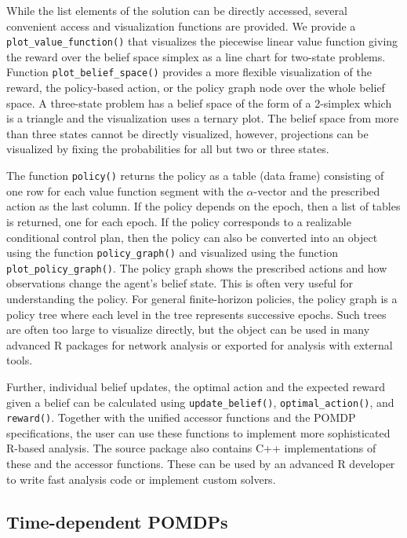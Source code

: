 While the list elements of the solution can be directly accessed, several convenient access and visualization functions are provided.
We provide a \texttt{plot\_value\_function()} that visualizes the piecewise linear value function giving the reward over the belief space simplex as a line chart for two-state problems. Function \texttt{plot\_belief\_space()}
provides a more flexible visualization of the reward, the policy-based action, or the policy graph node
over the whole belief space. A three-state problem has a belief space of the form of a 2-simplex which is a triangle
and the visualization uses a ternary plot.
The belief space from more than three states cannot be directly visualized, however, projections
can be visualized by fixing the probabilities for all but two or three states.

The function \texttt{policy()} returns the policy as a table (data frame) consisting of
one row for each value function segment with the \(\alpha\)-vector and the prescribed action as the last column.
If the policy depends on the epoch, then a list of tables is returned, one for
each epoch.
If the policy corresponds to a realizable conditional control plan, then
the policy can also be converted into an  object using the function
\texttt{policy\_graph()} and visualized using the function \texttt{plot\_policy\_graph()}.
The policy graph shows the prescribed actions and how observations change the agent's belief state.
This is often very useful for understanding the
policy. For general finite-horizon policies, the policy graph is a
policy tree where each level in the tree represents successive epochs.
Such trees are often too large to visualize directly, but the  object
can be used in many advanced R packages for network analysis or exported for analysis with external tools.

Further,
individual belief updates, the optimal action and the expected reward given a belief can be calculated using
\texttt{update\_belief()},
\texttt{optimal\_action()}, and
\texttt{reward()}. Together with the unified accessor functions and the POMDP specifications,
the user can use these functions
to implement more sophisticated R-based analysis.
The source package also contains C++ implementations of these and the accessor functions. These can be used by an advanced
R developer to write fast analysis code or implement custom solvers.

\subsection{Time-dependent POMDPs}\label{time-dependent-pomdps}

